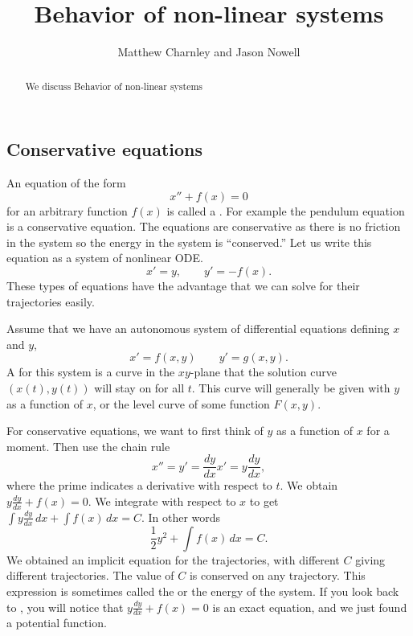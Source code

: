 \documentclass{ximera}
\title{Behavior of non-linear systems}
\author{Matthew Charnley and Jason Nowell}
\begin{document}
\begin{abstract}
    We discuss Behavior of non-linear systems
\end{abstract}
\maketitle

\label{nlinHamiltonian:section}


\subsection{Conservative equations}

An equation of the form
\begin{equation*}
    x'' + f(x) = 0
\end{equation*}
for an arbitrary function $f(x)$ is called a \emph{}.  For example the pendulum equation is a conservative equation.  The equations are conservative as there is no friction in the system so the energy in the system is ``conserved.'' Let us write this equation as a system of nonlinear ODE.
\begin{equation*}
x' = y, \qquad y' = -f(x) .
\end{equation*}
These types of equations have the advantage that we can solve for their trajectories easily.

\begin{definition}
    Assume that we have an autonomous system of differential equations defining $x$ and $y$, 
    \begin{equation*}
        x' = f(x,y) \qquad y' = g(x,y).
    \end{equation*}
    A \emph{} for this system is a curve in the $xy$-plane that the solution curve $(x(t), y(t))$ will stay on for all $t$. This curve will generally be given with $y$ as a function of $x$, or the level curve of some function $F(x,y)$. 
\end{definition}

For conservative equations, we want to first think of $y$ as a function of $x$ for a moment.  Then use the chain rule
\begin{equation*}
    x'' = y' = \frac{dy}{dx} x' = y \frac{dy}{dx} ,
\end{equation*}
where the prime indicates a derivative with respect to $t$. We obtain $y \frac{dy}{dx} + f(x) = 0$.  We integrate with respect to $x$ to get $\int y \frac{dy}{dx} \,dx + \int f(x)\, dx = C$.  In other words
\begin{equation*}
    \frac{1}{2} y^2  + \int f(x)\, dx = C .
\end{equation*}
We obtained an implicit equation for the trajectories, with different $C$ giving different trajectories.  The value of $C$ is conserved on any trajectory.  This expression is sometimes called the \emph{} or the energy of the system. If you look back to , you will notice that $y\frac{dy}{dx} + f(x) = 0$ is an exact equation, and we just found a potential function.
\end{document}
